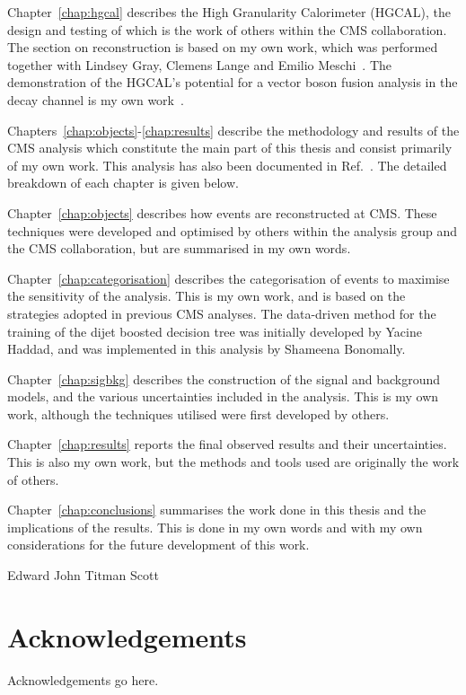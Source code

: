 Chapter~\ref{chap:hgcal} describes the High Granularity Calorimeter (HGCAL), 
the design and testing of which is the work of others within the CMS collaboration. 
The section on reconstruction is based on my own work, 
which was performed together with Lindsey Gray, Clemens Lange and Emilio Meschi~\cite{ClusteringConf}.
The demonstration of the HGCAL's potential for a vector boson fusion analysis 
in the \Hgg decay channel is my own work~\cite{HGCAL}.

Chapters~\ref{chap:objects}-\ref{chap:results} describe the methodology and results of the CMS \Hgg analysis
which constitute the main part of this thesis and consist primarily of my own work.
This analysis has also been documented in Ref.~\cite{HIG-18-029}.
The detailed breakdown of each chapter is given below.

Chapter~\ref{chap:objects} describes how events are reconstructed at CMS.
These techniques were developed and optimised by others within the \Hgg analysis group 
and the CMS collaboration, but are summarised in my own words.

Chapter~\ref{chap:categorisation} describes the categorisation of events 
to maximise the sensitivity of the analysis.
This is my own work, and is based on the strategies adopted in previous CMS \Hgg analyses.
The data-driven method for the training of the dijet boosted decision tree 
was initially developed by Yacine Haddad, and was implemented in this analysis by Shameena Bonomally.

Chapter~\ref{chap:sigbkg} describes the construction of the signal and background models, 
and the various uncertainties included in the analysis.
This is my own work, although the techniques utilised were first developed by others.

Chapter~\ref{chap:results} reports the final observed results and their uncertainties.
This is also my own work, but the methods and tools used are originally the work of others.

Chapter~\ref{chap:conclusions} summarises the work done in this thesis 
and the implications of the results.
This is done in my own words and with my own considerations for the future development of this work.

\begin{flushright}
    Edward John Titman Scott
\end{flushright}


\chapter*{\centering Acknowledgements}
Acknowledgements go here.


\tableofcontents
\listoffigures
\listoftables




\cleardoublepage
